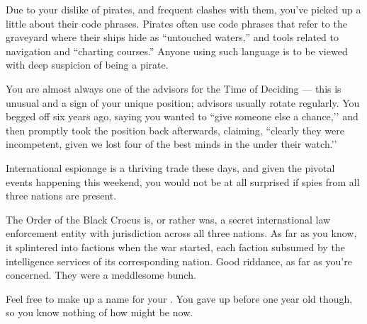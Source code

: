 \documentclass[char]{GL2020}
\begin{document}
\begin{itemz}[Notes]
    \item Due to your dislike of pirates, and frequent clashes with them, you've picked up a little about their code phrases. Pirates often use code phrases that refer to the graveyard where their ships hide as ``untouched waters,'' and tools related to navigation and ``charting courses.'' Anyone using such language is to be viewed with deep suspicion of being a pirate.
    \item You are almost always one of the advisors for the Time of Deciding — this is unusual and a sign of your unique position; advisors usually rotate regularly. You begged off six years ago, saying you wanted to ``give someone else a chance,’’ and then promptly took the position back afterwards, claiming, ``clearly they were incompetent, given we lost four of the best minds in the \pFarm{} under their watch.’’
    \item International espionage is a thriving trade these days, and given the pivotal events happening this weekend, you would not be at all surprised if spies from all three nations are present.
    \item The Order of the Black Crocus is, or rather was, a secret international law enforcement entity with jurisdiction across all three nations. As far as you know, it splintered into factions when the war started, each faction subsumed by the intelligence services of its corresponding nation. Good riddance, as far as you're concerned. They were a meddlesome bunch.
     \item Feel free to make up a name for your \cPirateChild{\offspring}. You gave \cPirateChild{\them} up before \cPirateChild{\theywere} one year old though, so you know nothing of how \cPirateChild{\they} might be now.
\end{itemz}
\end{document}
